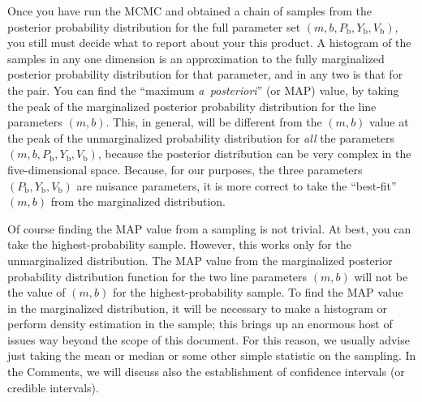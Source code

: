 \documentclass[12pt,twoside]{article}
\newcommand{\notenglish}[1]{\textsl{#1}}
\newcommand{\aposteriori}{\notenglish{a~posteriori}}
\newcommand{\documentname}{document}
\newcommand{\commentsname}{Comments}
\newcommand{\Pbad}{P_{\mathrm{b}}}
\newcommand{\Ybad}{Y_{\mathrm{b}}}
\newcommand{\Vbad}{V_{\mathrm{b}}}
\begin{document}
Once you have run the MCMC and obtained a chain of samples from the
posterior probability distribution for the full parameter set
$(m,b,\Pbad,\Ybad,\Vbad)$, you still must decide what to report about
your this product.  A histogram of the samples in any one dimension is
an approximation to the fully marginalized posterior probability
distribution for that parameter, and in any two is that for the pair.
You can find the ``maximum \aposteriori'' (or MAP) value, by taking
the peak of the marginalized posterior probability distribution for
the line parameters $(m,b)$.  This, in general, will be different from
the $(m,b)$ value at the peak of the unmarginalized probability
distribution for \emph{all} the parameters $(m,b,\Pbad,\Ybad,\Vbad)$,
because the posterior distribution can be very complex in the
five-dimensional space.  Because, for our purposes, the three
parameters $(\Pbad,\Ybad,\Vbad)$ are nuisance parameters, it is more
correct to take the ``best-fit'' $(m,b)$ from the marginalized
distribution.

Of course finding the MAP value from a sampling is not trivial.  At
best, you can take the highest-probability sample.  However, this
works only for the unmarginalized distribution.  The MAP value from
the marginalized posterior probability distribution function for the
two line parameters $(m,b)$ will not be the value of $(m,b)$ for the
highest-probability sample.  To find the MAP value in the marginalized
distribution, it will be necessary to make a histogram or perform
density estimation in the sample; this brings up an enormous host of
issues way beyond the scope of this \documentname.  For this reason,
we usually advise just taking the mean or median or some other simple
statistic on the sampling.  In the \commentsname, we will discuss also
the establishment of confidence intervals (or credible intervals).
\end{document}
